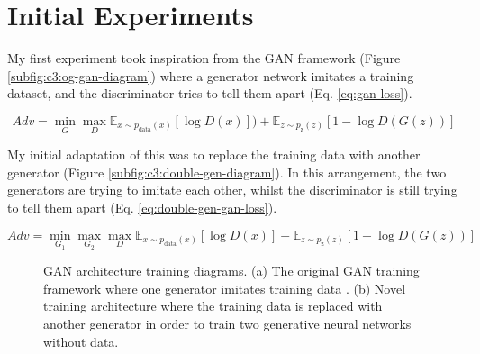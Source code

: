 \section{Initial Experiments}

My first experiment took inspiration from the GAN framework (Figure \ref{subfig:c3:og-gan-diagram}) where a generator network imitates a training dataset, and the discriminator tries to tell them apart (Eq. \ref{eq:gan-loss}). 

\begin{equation} 
    Adv =\min_{G}\max_{D}\mathbb{E}_{x\sim p_{\text{data}}(x)}[\log{D(x)}])+  \mathbb{E}_{z\sim p_{\text{z}}(z)}[1 - \log{D(G(z))}]
    \label{eq:gan-loss}
\end{equation}

My initial adaptation of this was to replace the training data with another generator (Figure \ref{subfig:c3:double-gen-diagram}). 
In this arrangement, the two generators are trying to imitate each other, whilst the discriminator is still trying to tell them apart (Eq. \ref{eq:double-gen-gan-loss}).

\begin{equation} 
    Adv = \min_{G_{1}}\max_{G_2}\max_{D}\mathbb{E}_{x\sim p_{\text{data}}(x)}[\log{D(x)}] +  \mathbb{E}_{z\sim p_{\text{z}}(z)}[1 - \log{D(G(z))}]
    \label{eq:double-gen-gan-loss}
\end{equation}

\begin{figure}[!htbp]
    \centering
    \hfill
    \caption[GAN architecture training diagrams]{GAN architecture training diagrams. (a) The original GAN training framework where one generator imitates training data \citep{goodfellow2014generative}. (b) Novel training architecture where the training data is replaced with another generator in order to train two generative neural networks without data.}
    \label{fig:c3:gan-diagrams}
  \end{figure}

